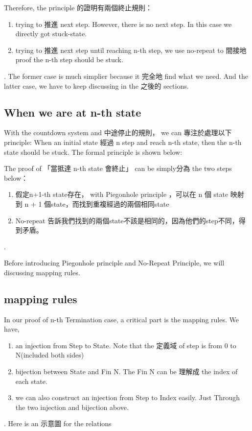 Therefore, the principle 的證明有兩個終止規則：
\begin{enumerate}[1.]
    \item trying to 推進 next step.  However, there is no next step.  In this case we directly got stuck-state. 
    \item trying to 推進 next step until reaching n-th step, we use no-repeat to 間接地 proof the n-th step should be stuck.
\end{enumerate}.
The former case is much simplier because it 完全地 find what we need. 
And the latter case, we have to keep discussing in the 之後的 sections.

\subsection{ When we are at n-th state }

With the countdown system and 中途停止的規則， we can 專注於處理以下 principle:
When an initial state 經過 n step and reach n-th state, then the n-th state should be stuck.
The formal principle is shown below:




The proof of 「當抵達 n-th state 會終止」 can be simply分為 the two steps below：
\begin{enumerate}[1.]
    \item 假定n+1-th state存在， with Piegonhole principle ，可以在 n 個 state 映射到 n + 1 個state，而找到重複經過的兩個相同state
    \item No-repeat 告訴我們找到的兩個state不該是相同的，因為他們的step不同，得到矛盾。
\end{enumerate}.

Before introducing Piegonhole principle and No-Repeat Principle, we will discussing mapping rules.

\subsection{ mapping rules }
In our proof of n-th Termination case, a critical part is the mapping rules.
We have,
\begin{enumerate}[1.]
    \item an injection from Step to State.  Note that the 定義域 of step is from 0 to N(included both sides)
    \item bijection between State and Fin N.  The Fin N can be 理解成 the index of each state.
    \item we can also construct an injection from Step to Index easily.  Just Through the two injection and bijection above.
\end{enumerate}.
Here is an 示意圖 for the relations


